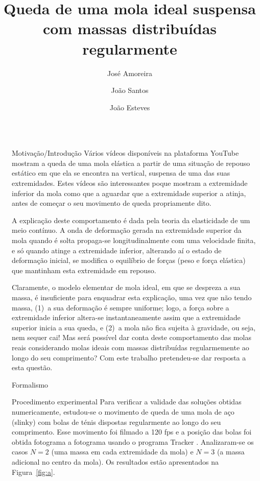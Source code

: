 \documentclass[final]{beamer}
\title{Queda de uma mola ideal suspensa com massas distribuídas regularmente}
\author{José Amoreira \inst{1,2,3} \and João Santos \inst{2} \and João Esteves \inst{2}}
\institute[]{\inst{1} Laboratório de Instrumentação e Física Experimental de Partículas \and  \inst{2}Universidade da Beira Interior  \samelineand \inst{3} Centro de Matemática e Aplicações}
\newlength{\sepwidth}
\newlength{\colwidth}
\newcommand{\separatorcolumn}{\begin{column}{\sepwidth}\end{column}}
\begin{document}
\begin{frame}[t]
\begin{columns}[t]
\separatorcolumn
\begin{column}{\colwidth}
\begin{exampleblock}{Motivação/Introdução}
  Vários vídeos disponíveis na plataforma YouTube mostram a queda de uma mola
  elástica a partir de uma situação de repouso estático em que ela se encontra
  na vertical, suspensa de uma das suas extremidades. Estes vídeos são
  interessantes poque mostram a extremidade inferior da mola como que a aguardar
  que a extremidade superior a atinja, antes de começar o seu movimento de queda
  propriamente dito. 
	
  A explicação deste comportamento é dada pela teoria da elasticidade de um meio
  contínuo. A onda de deformação gerada na extremidade superior da mola quando é
  solta propaga-se longitudinalmente com uma velocidade finita, e só quando
  atinge a extremidade inferior, alterando aí o estado de deformação inicial, se
  modifica o equilíbrio de forças (peso e força elástica) que mantinham esta
  extremidade em repouso.
	
  Claramente, o modelo elementar de mola ideal, em que se despreza a sua massa,
  é insuficiente para enquadrar esta explicação, uma vez que não tendo massa,
  (1)~a sua deformação é sempre uniforme; logo, a força sobre a extremidade
  inferior altera-se instantaneamente assim que a extremidade superior inicia a
  sua queda, e (2)~a mola não fica sujeita à gravidade, ou seja, nem sequer cai!
  Mas será possível dar conta deste comportamento das molas reais considerando
  molas ideais com massas distribuídas regularmemente ao longo do seu
  comprimento? Com este trabalho pretendeu-se dar resposta a esta questão.
\end{exampleblock}
\begin{block}{Formalismo}
	\vspace{1cm}
	
\end{block}
\begin{block}{Procedimento experimental}
Para verificar a validade das soluções obtidas numericamente, estudou-se o
movimento de queda de uma mola de aço (slinky) com bolas de ténis dispostas
regularmente ao longo do seu comprimento. Esse movimento foi filmado a 120 fps e
a posição das bolas foi obtida fotograma a fotograma usando o programa Tracker
\cite{Tracker}. Analizaram-se os casos $N=2$ (uma massa em cada extremidade da
mola) e $N=3$ (a massa adicional no centro da mola). Os resultados estão
apresentados na Figura~\ref{fig:a}.


\end{block}
\end{column}
\end{columns}
\end{frame}
\end{document}
